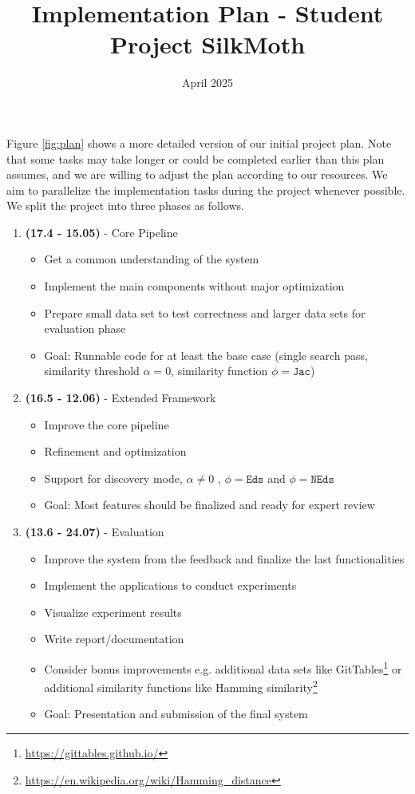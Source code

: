 \documentclass[a4paper]{article}
\title{Implementation Plan - Student Project SilkMoth}
\date{April 2025}
\begin{document}
\maketitle

Figure \ref{fig:plan} shows a more detailed version of our initial project plan. Note that some tasks may take longer or could be completed earlier than this plan assumes, and we are willing to adjust the plan according to our resources. We aim to parallelize the implementation tasks during the project whenever possible. We split the project into three phases as follows.

\begin{enumerate}
    \item \textbf{(17.4 - 15.05)} - Core Pipeline
    \begin{itemize}
        \item Get a common understanding of the system
        \item Implement the main components without major optimization
        \item Prepare small data set to test correctness and larger data sets for evaluation phase
        \item Goal: Runnable code for at least the base case (single search pass, similarity threshold $\alpha = 0$, similarity function $\phi = \texttt{Jac}$)
    \end{itemize}
    \item \textbf{(16.5 - 12.06)} - Extended Framework
    \begin{itemize}
        \item Improve the core pipeline
        \item Refinement and optimization
        \item Support for discovery mode, $\alpha \neq 0$ , $\phi = \texttt{Eds}$ and $\phi = \texttt{NEds}$
        \item Goal: Most features should be finalized and ready for expert review
    \end{itemize}
    \item \textbf{(13.6 - 24.07)} - Evaluation
    \begin{itemize}
        \item Improve the system from the feedback and finalize the last functionalities 
        \item Implement the applications to conduct experiments
        \item Visualize experiment results
        \item Write report/documentation
        \item Consider bonus improvements e.g. additional data sets like GitTables\footnote{\url{https://gittables.github.io/}} or additional similarity functions like Hamming similarity\footnote{\url{https://en.wikipedia.org/wiki/Hamming_distance}}
        \item Goal: Presentation and submission of the final system
    \end{itemize}
\end{enumerate}
\end{document}
